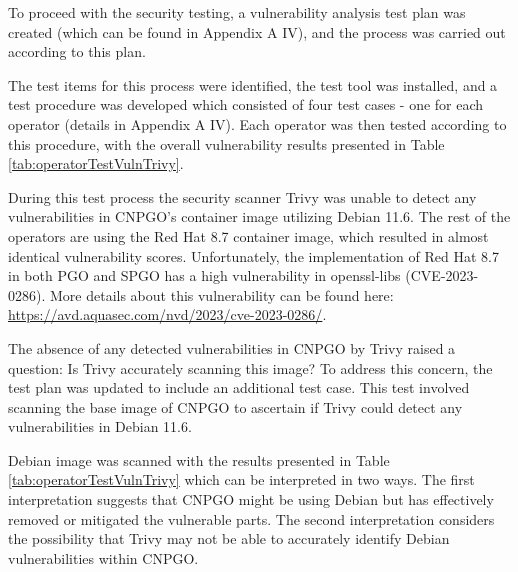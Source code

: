 To proceed with the security testing, a vulnerability analysis test plan was created (which can be found in Appendix A IV), and the process was carried out according to this plan.

The test items for this process were identified, the test tool was installed, and a test procedure was developed which consisted of four test cases - one for each operator (details in Appendix A IV).
Each operator was then tested according to this procedure, with the overall vulnerability results presented in Table \ref{tab:operatorTestVulnTrivy}.

During this test process the security scanner Trivy was unable to detect any vulnerabilities in CNPGO's container image utilizing Debian 11.6.
The rest of the operators are using the Red Hat 8.7 container image, which resulted in almost identical vulnerability scores.
Unfortunately, the implementation of Red Hat 8.7 in both PGO and SPGO has a high vulnerability in openssl-libs (CVE-2023-0286).
More details about this vulnerability can be found here: \url{https://avd.aquasec.com/nvd/2023/cve-2023-0286/}.


The absence of any detected vulnerabilities in CNPGO by Trivy raised a question: Is Trivy accurately scanning this image? To address this concern, the test plan was updated to include an additional test case.
This test involved scanning the base image of CNPGO to ascertain if Trivy could detect any vulnerabilities in Debian 11.6.

Debian image was scanned with the results presented in Table \ref{tab:operatorTestVulnTrivy} which can be interpreted in two ways. The first interpretation suggests that CNPGO might be using Debian but has effectively removed or mitigated the vulnerable parts. The second interpretation considers the possibility that Trivy may not be able to accurately identify Debian vulnerabilities within CNPGO.


